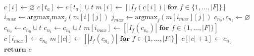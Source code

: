 \documentclass[letterpaper]{article} %
\begin{document}
\begin{algorithm}[t] 
\caption{Compute abstract states based on transition samples and learned policy.} \label{alg_makePolicyGraph}
\begin{algorithmic}[1]
      \State $c[i] \leftarrow \varnothing$ 
    \EndFor
     
        \State $c[t_a] \leftarrow c[t_a] \cup t$ 
      \EndIf
    \EndFor
     
      \State $m[i] \leftarrow [ | I_f(c[i]) | \textbf{ for } f \in \{1, \ldots, |F|\}]$ 
    \EndFor
      \State $i_{max} \leftarrow \text{argmax}_i \text{max}_j \left( m[i][j] \right)$
      \State $j_{max} \leftarrow \text{argmax}_j \left( m[i_{max}][j] \right)$ 
      \State $c_{n_0}, c_{n_1} \leftarrow \varnothing$
       
          \State $c_{n_0} \leftarrow c_{n_0} \cup t$
        \Else
          \State $c_{n_1} \leftarrow c_{n_1} \cup t$
        \EndIf
      \EndFor
      \State $m[i_{max}] \leftarrow [|I_f(c_{n_0})| \textbf{ for } f \in \{1, \ldots, |F|\}]$ 
      \State $c[i_{max}] \leftarrow c_{n_0}$
      \State $m[|c|] \leftarrow [|I_f(c_{n_1})| \textbf{ for } f \in \{1, \ldots, |F|\}]$
      \State $c[|c| + 1] \leftarrow c_{n_1}$
    \EndWhile
    \State $\textbf{return } c$
  \EndProcedure
\end{algorithmic}
\end{algorithm}
\end{document}
